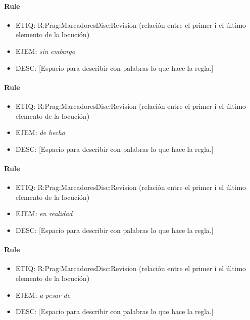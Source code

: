 \documentclass[11pt]{report}
\begin{document}
\paragraph*{Rule}
\begin{itemize}
\item ETIQ: R:Prag:MarcadoresDisc:Revision (relación entre el primer i el último elemento de la locución)
\item EJEM: \emph{sin embargo}
\item DESC: [Espacio para describir con palabras lo que hace la regla.]
\end{itemize}

\paragraph*{Rule}
\begin{itemize}
\item ETIQ: R:Prag:MarcadoresDisc:Revision (relación entre el primer i el último elemento de la locución)
\item EJEM: \emph{de hecho}
\item DESC: [Espacio para describir con palabras lo que hace la regla.]
\end{itemize}

\paragraph*{Rule}
\begin{itemize}
\item ETIQ: R:Prag:MarcadoresDisc:Revision (relación entre el primer i el último elemento de la locución)
\item EJEM: \emph{en realidad}
\item DESC: [Espacio para describir con palabras lo que hace la regla.]
\end{itemize}

\paragraph*{Rule}
\begin{itemize}
\item ETIQ: R:Prag:MarcadoresDisc:Revision (relación entre el primer i el último elemento de la locución)
\item EJEM: \emph{a pesar de}
\item DESC: [Espacio para describir con palabras lo que hace la regla.]
\end{itemize}
\end{document}
